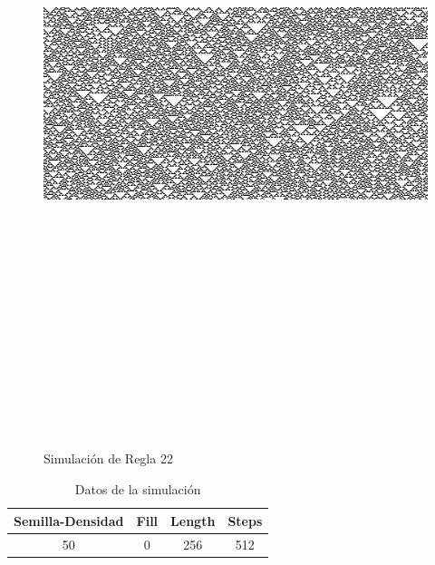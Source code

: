 \documentclass[12pt, letterpaper]{article}
\title{ Reporte \rule }
\author{Fi App}
\renewcommand{\rule}{Regla 22}
\begin{document}
 
 \begin{titlepage} 
 \maketitle 
 \tableofcontents 
 \end{titlepage} 
 \clearpage 
 \begin{figure}[H]
  \centering
  \includegraphics[height=200mm,width=200mm,keepaspectratio]{simAnalysis.png} 
   \caption{Simulación de \rule} 
\end{figure}
\begin{table}[H]
  \centering
  \begin{tabular}{|c|c|c|c| }
     \hline Semilla-Densidad & Fill & Length & Steps  \\ 
      \hline    50 & 0 & 256 & 512 \\ 
      \hline 
       \end{tabular} 
      \caption{Datos de la simulación} 
    \end{table} 
\end{document}

